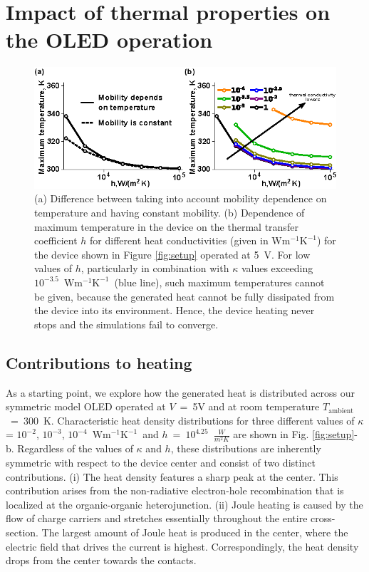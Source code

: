 \documentclass[%
9pt,
 aip,
rsi,%
 amsmath,amssymb,
preprint,%
]{revtex4-1}
\newcommand{\thermalconductivity}{$\mathrm{W m^{-1} K^{-1}}$}
\begin{document}
\section{Impact of thermal properties on the OLED operation}

\begin{figure}
	\centering
    \includegraphics{Fig_3.eps} 
    \caption{(a) Difference between taking into account mobility dependence on temperature and having constant mobility. (b) Dependence of maximum temperature in the device on the thermal transfer coefficient $h$ for different heat conductivities (given in \thermalconductivity) for the device shown in Figure \ref{fig:setup} operated at 5~V. 
    For low values of $h$, particularly in combination with $\kappa$ values exceeding $10^{-3.5}$~\thermalconductivity~(blue line), such maximum temperatures cannot be given, because the generated heat cannot be fully dissipated from the device into its environment. Hence, the device heating never stops and the simulations fail to converge.}
\label{fig:I-Vandh-k-maxT}
\end{figure}

\subsection{Contributions to heating}
As a starting point, we explore how the generated heat is distributed across our symmetric model OLED operated at $V$~=~5V and at room temperature $T_{\mathrm{ambient}}$~=~300~K. 
Characteristic heat density distributions for three different values of $\kappa$ = $10^{-2}$, $10^{-3}$, $10^{-4}$~\thermalconductivity~and $h$~=~$10^{4.25}$~$\frac{W}{m^2 K}$ are shown in Fig. \ref{fig:setup}-b.
Regardless of the values of $\kappa$ and $h$, these distributions are inherently symmetric with respect to the device center and consist of two distinct contributions. 
(i) The heat density features a sharp peak at the center. 
This contribution arises from the non-radiative electron-hole recombination that is localized at the organic-organic heterojunction. 
(ii) Joule heating is caused by the flow of charge carriers and stretches essentially throughout the entire cross-section. 
The largest amount of Joule heat is produced in the center, where the electric field that drives the current is highest. 
Correspondingly, the heat density drops from the center towards the contacts. 
\end{document}
